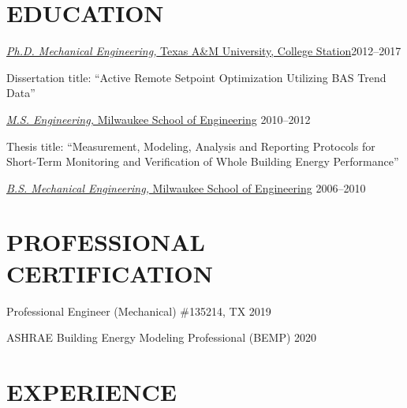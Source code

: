 \documentclass[margin]{res} %
\begin{document}
\begin{resume}





\section{EDUCATION}

\underline{{\textit{Ph.D. Mechanical Engineering,} Texas A\&M University, College Station}}\hfill 2012--2017

\parbox{11cm}{Dissertation title: ``Active Remote Setpoint Optimization Utilizing BAS Trend Data''}

\underline{{\sl M.S. Engineering,} Milwaukee School of Engineering} \hfill 2010--2012

\parbox{11cm}{Thesis title: ``Measurement, Modeling, Analysis and Reporting Protocols for Short-Term Monitoring and Verification of Whole Building Energy Performance''}

\underline{{\sl B.S. Mechanical Engineering,} Milwaukee School of Engineering} \hfill 2006--2010

\section{PROFESSIONAL CERTIFICATION}

Professional Engineer (Mechanical) \#135214, TX \hfill 2019

ASHRAE Building Energy Modeling Professional (BEMP) \hfill 2020

\vspace{0.1in}

\section{EXPERIENCE}


\end{resume}
\end{document}
